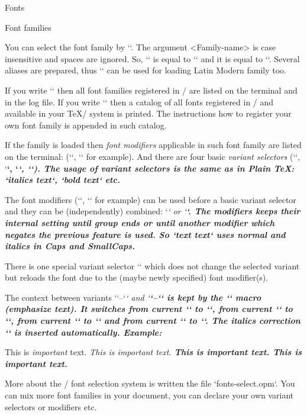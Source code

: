 \sec Fonts

\secc[fontfam] Font families

You can select the font family by ``.
The argument <Family-name> is case insensitive and spaces are ignored. So,
`\fontfam[LM Fonts]` is equal to `\fontfam[LMfonts]` and it is equal
to `\fontfam[lmfonts]`. Several aliases are prepared, thus 
`` can be used for loading Latin Modern family too.

If you write `\fontfam[?]` then all font families registered in \OpTeX/ 
are listed on the terminal and in the log file.
If you write `\fontfam[catalog]` then a catalog of all fonts registered in
\OpTeX/ and available in your \TeX/ system is printed. The instructions
how to register your own font family is appended in such catalog.

If the family is loaded then {\em font modifiers} applicable in such font family
are listed on the terminal: (`\caps`, `\cond` for example).
And there are four basic {\em variant selectors} (`\rm`, `\bf`, `\it`, `\bi`).
The usage of variant selectors is the same as in Plain \TeX: 
`{\it italics text}`, `{\bf bold text}` etc.

The font modifiers (`\caps`, `\cond` for example) can
be used before a basic variant selector and they
can be (independently) combined: `\caps\it` or `\cond\caps\bf`. The
modifiers keeps their internal setting until group ends or until another
modifier which negates the previous feature is used. So
`\caps \rm text \it text`  uses normal and italics in Caps and SmallCaps.

\new
There is one special variant selector `\currvar` which does not change the
selected variant but reloads the font due to the (maybe newly
specified) font modifier(s).

The context between variants `\rm`--`\it` and `\bf`--`\bi` is kept by the `\em`
macro (emphasize text).  
It switches from current `\rm` to `\it`, from current `\it` to `\rm`, from
current `\bf` to `\bi` and from current `\bi` to `\bf`.
The italics correction `\/` is inserted automatically. Example:

\begtt
This is {\em important} text.     %
\it This is {\em important} text. %
\bf This is {\em important} text. %
\bi This is {\em important} text. %
\endtt

\new
More about the \OpTeX/ font selection system is written the file
`fonts-select.opm`. You can mix more font families in your document, you can
declare your own variant selectors or modifiers etc.


